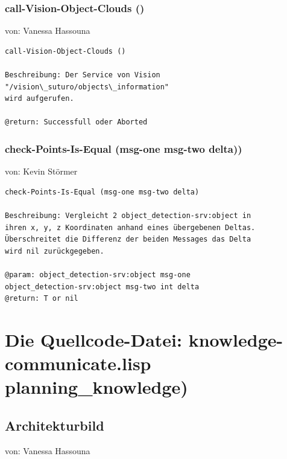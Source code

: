 \documentclass{suturo}
\makeatletter
\newcommand{\chapterauthor}[1]{%
  {\parindent0pt\vspace*{-27pt}%
  \linespread{0}\small\begin{flushright}von: #1\end{flushright}%
  \par\nobreak\vspace*{0pt}}
  \@afterheading%
}
\makeatother
\begin{document}
\subsubsection{call-Vision-Object-Clouds ()}
\chapterauthor{Vanessa Hassouna}
\begin{verbatim}
call-Vision-Object-Clouds ()

Beschreibung: Der Service von Vision "/vision\_suturo/objects\_information"
wird aufgerufen.

@return: Successfull oder Aborted
\end{verbatim}


\subsubsection{check-Points-Is-Equal (msg-one msg-two delta))}
\chapterauthor{Kevin Störmer}
\begin{verbatim}
check-Points-Is-Equal (msg-one msg-two delta)

Beschreibung: Vergleicht 2 object_detection-srv:object in
ihren x, y, z Koordinaten anhand eines übergebenen Deltas.
Überschreitet die Differenz der beiden Messages das Delta
wird nil zurückgegeben.

@param: object_detection-srv:object msg-one 
object_detection-srv:object msg-two int delta
@return: T or nil
\end{verbatim}

\section{Die Quellcode-Datei: knowledge-communicate.lisp\\
planning\_knowledge)}

\subsection{Architekturbild}
\chapterauthor{Vanessa Hassouna}

\begin{figure}[!htb]
\end{figure}
\end{document}
